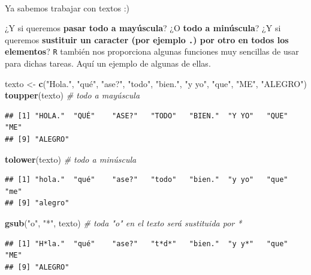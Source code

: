 \documentclass[11pt,]{book}
\newenvironment{Shaded}{\begin{snugshade}}{\end{snugshade}}
\newcommand{\CommentTok}[1]{\textcolor[rgb]{0.37,0.37,0.37}{\textit{#1}}}
\newcommand{\KeywordTok}[1]{\textcolor[rgb]{0.27,0.27,0.27}{\textbf{#1}}}
\newcommand{\NormalTok}[1]{#1}
\newcommand{\StringTok}[1]{\textcolor[rgb]{0.5,0.5,0.5}{#1}}
\begin{document}
~

Ya sabemos trabajar con textos :)

¿Y si queremos \textbf{pasar todo a mayúscula}? ¿O \textbf{todo a minúscula}? ¿Y si queremos \textbf{sustituir un caracter (por ejemplo \texttt{.}) por otro en todos los elementos}? \texttt{R} también nos proporciona algunas funciones muy sencillas de usar para dichas tareas. Aquí un ejemplo de algunas de ellas.

\begin{Shaded}
\begin{Highlighting}[]
\NormalTok{texto <-}\StringTok{ }\KeywordTok{c}\NormalTok{(}\StringTok{"Hola."}\NormalTok{, }\StringTok{"qué"}\NormalTok{, }\StringTok{"ase?"}\NormalTok{, }\StringTok{"todo"}\NormalTok{, }\StringTok{"bien."}\NormalTok{, }\StringTok{"y yo"}\NormalTok{,}
           \StringTok{"que"}\NormalTok{, }\StringTok{"ME"}\NormalTok{, }\StringTok{"ALEGRO"}\NormalTok{)}
\KeywordTok{toupper}\NormalTok{(texto) }\CommentTok{# todo a mayúscula}
\end{Highlighting}
\end{Shaded}

\begin{verbatim}
## [1] "HOLA."  "QUÉ"    "ASE?"   "TODO"   "BIEN."  "Y YO"   "QUE"    "ME"    
## [9] "ALEGRO"
\end{verbatim}

\begin{Shaded}
\begin{Highlighting}[]
\KeywordTok{tolower}\NormalTok{(texto) }\CommentTok{# todo a minúscula}
\end{Highlighting}
\end{Shaded}

\begin{verbatim}
## [1] "hola."  "qué"    "ase?"   "todo"   "bien."  "y yo"   "que"    "me"    
## [9] "alegro"
\end{verbatim}

\begin{Shaded}
\begin{Highlighting}[]
\KeywordTok{gsub}\NormalTok{(}\StringTok{"o"}\NormalTok{, }\StringTok{"*"}\NormalTok{, texto) }\CommentTok{# toda "o" en el texto será sustituida por *}
\end{Highlighting}
\end{Shaded}

\begin{verbatim}
## [1] "H*la."  "qué"    "ase?"   "t*d*"   "bien."  "y y*"   "que"    "ME"    
## [9] "ALEGRO"
\end{verbatim}
\end{document}
